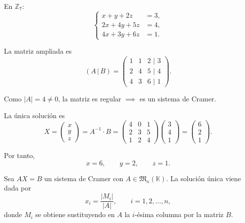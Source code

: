\documentclass[a4paper,12pt]{article}
\begin{document}
\begin{ejemplo}
En $\mathbb{Z}_7$:
\[
\left\{
\begin{aligned}
x + y + 2z &= 3,\\
2x + 4y + 5z &= 4,\\
4x + 3y + 6z &= 1.
\end{aligned}
\right.
\]

La matriz ampliada es
\[
(A\,|\,B)=
\begin{pmatrix}
1 & 1 & 2 \,\,\Big|\,\, 3\\
2 & 4 & 5 \,\,\Big|\,\, 4\\
4 & 3 & 6 \,\,\Big|\,\, 1
\end{pmatrix}.
\]

Como $|A| = 4 \neq 0$, la matriz es regular $\implies$ es un sistema de Cramer.

La única solución es
\[
X=
\begin{pmatrix}
x\\y\\z
\end{pmatrix}
=
A^{-1}\cdot B
=
\begin{pmatrix}
4 & 0 & 1\\
2 & 3 & 5\\
1 & 2 & 4
\end{pmatrix}
\begin{pmatrix}
3\\4\\1
\end{pmatrix}
=
\begin{pmatrix}
6\\2\\1
\end{pmatrix}.
\]

Por tanto,  
\[
x = 6,\qquad y = 2,\qquad z = 1.
\]

\end{ejemplo}

\begin{procedimiento}[title=Fórmula de Cramer]
Sea $A X = B$ un sistema de Cramer con $A \in \mathfrak{M}_n(\mathbb{K})$.
La solución única viene dada por
\[
x_i = \frac{|M_i|}{|A|}, \qquad i = 1,2,\dots,n,
\]
donde $M_i$ se obtiene sustituyendo en $A$ la $i$-ésima columna por la matriz $B$.
\end{procedimiento}
\end{document}
